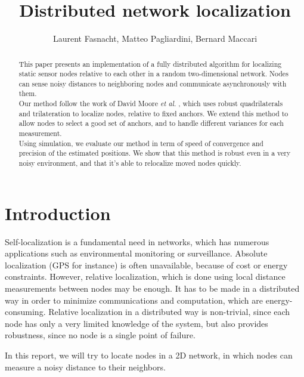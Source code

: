 \documentclass[letterpaper, 10 pt, conference]{ieeeconf}  %
\title{\LARGE \bf
 Distributed network localization
}
\author{Laurent Fasnacht, Matteo Pagliardini, Bernard Maccari%
}
\begin{document}
\maketitle
\thispagestyle{empty}
\pagestyle{empty}


\begin{abstract}
This paper presents an implementation of a fully distributed algorithm for localizing static sensor nodes relative to each other in a random two-dimensional network. Nodes can sense noisy distances to neighboring nodes and communicate asynchronously with them. \\
Our method follow the work of David Moore \emph{et al.} \cite{MooreTeller}, which uses robust quadrilaterals and trilateration to localize nodes, relative to fixed anchors. We extend this method to allow nodes to select a good set of anchors, and to handle different variances for each measurement. \\
Using simulation, we evaluate our method in term of speed of convergence and precision of the estimated positions. We show that this method is robust even in a very noisy environment, and that it's able to relocalize moved nodes quickly.\\
\end{abstract}


\section{Introduction}

Self-localization is a fundamental need in networks, which has numerous applications such as environmental monitoring or surveillance. Absolute localization (GPS for instance) is often unavailable, because of cost or energy constraints. However, relative localization, which is done using local distance measurements between nodes may be enough. It has to be made in a distributed way in order to minimize communications and computation, which are energy-consuming. Relative localization in a distributed way is non-trivial, since each node has only a very limited knowledge of the system, but also provides robustness, since no node is a single point of failure.

In this report, we will try to locate nodes in a 2D network, in which nodes can measure a noisy distance to their neighbors.
\end{document}
